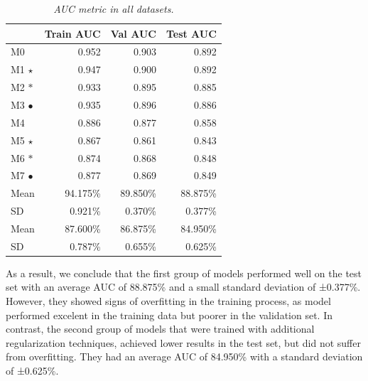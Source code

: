 \begin{table}[H]
    \centering
    \begin{tabular}{lrrr}
      \toprule
      & \textbf{Train AUC} & \textbf{Val AUC} & \textbf{Test AUC} \\
      \midrule
      M0 & 0.952 & 0.903 & 0.892  \\
      M1 $\star$ & 0.947 & 0.900 & 0.892 \\
      M2 $\ast$ & 0.933 & 0.895 & 0.885 \\
      M3 $\bullet$ & 0.935 & 0.896 & 0.886 \\
      \midrule
      \cellcolor{gray!50}M4 & \cellcolor{gray!50}0.886 & \cellcolor{gray!50}0.877 & \cellcolor{gray!50}0.858 \\
      \cellcolor{gray!50}M5 $\star$ & \cellcolor{gray!50}0.867 & \cellcolor{gray!50}0.861 & \cellcolor{gray!50}0.843 \\
      \cellcolor{gray!50}M6 $\ast$ & \cellcolor{gray!50}0.874 & \cellcolor{gray!50}0.868 & \cellcolor{gray!50}0.848 \\
      \cellcolor{gray!50}M7 $\bullet$ & \cellcolor{gray!50}0.877 & \cellcolor{gray!50}0.869 & \cellcolor{gray!50}0.849 \\

      \midrule

      Mean &  94.175\% & 89.850\% & 88.875\%  \\
      SD   & 0.921\% & 0.370\% & 0.377\%  \\

      \midrule

      \cellcolor{gray!50}Mean & \cellcolor{gray!50}87.600\% & \cellcolor{gray!50}86.875\% & \cellcolor{gray!50}84.950\% \\
      \cellcolor{gray!50}SD & \cellcolor{gray!50}0.787\% & \cellcolor{gray!50}0.655\% & \cellcolor{gray!50}0.625\% \\

      \bottomrule
    \end{tabular}
    \caption[Metrics in the datasets]
    {\textit{AUC metric in all datasets. }}
    {\label{table:resume-metrics}}
  \end{table}


As a result, we conclude that the first group of models performed well on the
test set with an average AUC of 88.875\% and a small standard deviation of
±0.377\%. However, they showed signs of overfitting in the training process, as
model performed excelent in the training data but poorer in the validation set.
In contrast, the second group of models that were trained with additional
regularization techniques, achieved lower results in the test set, but did not
suffer from overfitting. They had an average AUC of 84.950\% with a standard
deviation of ±0.625\%.

